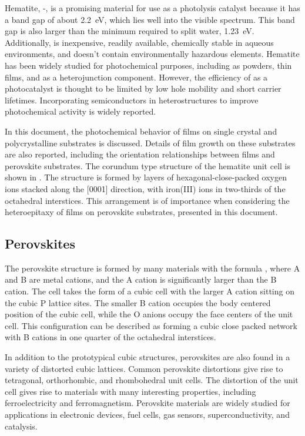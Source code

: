 Hematite, \textalpha-, is a promising material for use as a photolysis catalyst
because it has a band gap of about 2.2~eV, which lies well into the visible
spectrum.\cite{Lin:2011kw} This band gap is also larger than the minimum required to split
water, 1.23~eV. Additionally,  is inexpensive, readily available, chemically
stable in aqueous environments, and doesn't contain environmentally hazardous elements.
Hematite has been widely studied for photochemical purposes,\cite{Sivula:2011cc} including
as powders,\cite{GONDAL:2004df} thin films,\cite{Cao:2010dm} and as a heterojunction
component.\cite{Luo:2006kg,Wang:2007fp} However, the efficiency of  as a
photocatalyst is thought to be limited by low hole mobility and short carrier
lifetimes.\cite{Sivula:2011cc} Incorporating semiconductors in heterostructures to improve
photochemical activity is widely reported.\cite{Maruska:1979tr} 

In this document, the photochemical behavior of  films on single crystal and
polycrystalline substrates is discussed. Details of  film growth on these
substrates are also reported, including the orientation relationships between 
films and perovskite substrates. The corundum type structure of the hematite unit cell is
shown in . The structure is formed by layers of
hexagonal-close-packed oxygen ions stacked along the [0001] direction, with iron(III) ions
in two-thirds of the octahedral interstices. This arrangement is of importance when
considering the heteroepitaxy of  films on perovskite substrates, presented in
this document. 

\subsection{Perovskites}\label{subsec:background.perovskites}

The perovskite structure is formed by many materials with the formula , where A
and B are metal cations, and the A cation is significantly larger than the B
cation.\cite{Bhalla:2000ku} The cell takes the form of a cubic cell with the larger A
cation sitting on the cubic P lattice sites. The smaller B cation occupies the body
centered position of the cubic cell, while the O anions occupy the face centers of the
unit cell. This configuration can be described as  forming a cubic close packed
network with B cations in one quarter of the octahedral interstices.

In addition to the prototypical cubic structures, perovskites are also found in a variety
of distorted cubic lattices. Common perovskite distortions give rise to tetragonal,
orthorhombic, and rhombohedral unit cells. The distortion of the unit cell gives rise to
materials with many interesting properties, including ferroelectricity and ferromagnetism.
Perovskite materials are widely studied\cite{Bhalla:2000ku} for applications in electronic
devices,\cite{Kingon:2000wa} fuel cells,\cite{Zhu:2003jz,Jiang:2008fb} gas
sensors,\cite{Fergus:2007tm} superconductivity,\cite{Murphy:1987wc} and
catalysis.\cite{Lombardo:1998uv}

